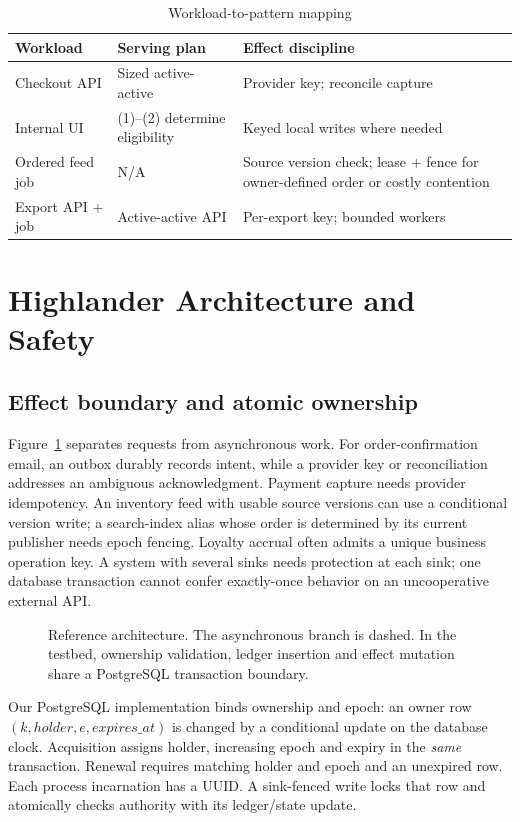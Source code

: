 \documentclass[conference,10pt]{IEEEtran}
\begin{document}
\begin{table}[t]\caption{Workload-to-pattern mapping}\label{tab:mapping}
\centering\footnotesize
\begin{tabularx}{\columnwidth}{p{.77in}YY}\toprule
Workload & Serving plan & Effect discipline\\\midrule
Checkout API & Sized active-active & Provider key; reconcile capture\\
Internal UI & (1)--(2) determine eligibility & Keyed local writes where needed\\
Ordered feed job & N/A & Source version check; lease + fence for owner-defined order or costly contention\\
Export API + job & Active-active API & Per-export key; bounded workers\\\bottomrule
\end{tabularx}
\end{table}

\section{Highlander Architecture and Safety}
\subsection{Effect boundary and atomic ownership}
Figure~\ref{fig:architecture} separates requests from asynchronous work. For order-confirmation email, an outbox durably records intent, while a provider key or reconciliation addresses an ambiguous acknowledgment. Payment capture needs provider idempotency. An inventory feed with usable source versions can use a conditional version write; a search-index alias whose order is determined by its current publisher needs epoch fencing. Loyalty accrual often admits a unique business operation key. A system with several sinks needs protection at each sink; one database transaction cannot confer exactly-once behavior on an uncooperative external API.

\begin{figure}[t]\centering
\caption{Reference architecture. The asynchronous branch is dashed. In the testbed, ownership validation, ledger insertion and effect mutation share a PostgreSQL transaction boundary.}\label{fig:architecture}
\end{figure}

Our PostgreSQL implementation binds ownership and epoch: an owner row $(k,holder,e,expires\_at)$ is changed by a conditional update on the database clock. Acquisition assigns holder, increasing epoch and expiry in the \emph{same} transaction. Renewal requires matching holder and epoch and an unexpired row. Each process incarnation has a UUID. A sink-fenced write locks that row and atomically checks authority with its ledger/state update.
\end{document}
